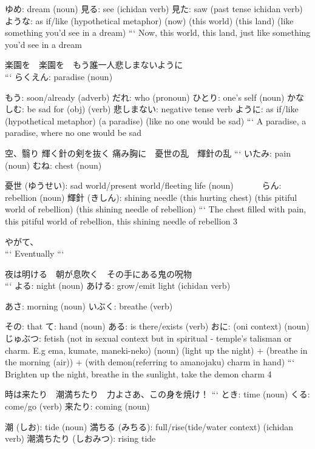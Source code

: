                             ゆめ: dream (noun)
                            見る: see (ichidan verb)
                            見た: saw (past tense ichidan verb)
                            ような: as if/like (hypothetical metaphor)
(now) (this world) (this land) (like something you'd see in a dream)
```
Now, this world, this land, just like something you'd see in a dream

楽園を　楽園を　もう誰一人悲しまないように \\
```
らくえん: paradise (noun)

              もう: soon/already (adverb)
                だれ: who (pronoun)
                ひとり: one's self (noun)
                          かなしむ: be sad for (obj) (verb)
                          悲しまない: negative tense verb
                                    ように: as if/like (hypothetical metaphor)
(a paradise) (like no one would be sad)
```
A paradise, a paradise, where no one would be sad

空、翳り
輝く針の剣を抜く
痛み胸に　憂世の乱　輝針の乱
```
いたみ: pain (noun)
    むね: chest (noun)

          憂世 (ゆうせい): sad world/present world/fleeting life (noun)
          　　　らん: rebellion (noun)
                  輝針 (きしん): shining needle
(this hurting chest) (this pitiful world of rebellion) (this shining needle of rebellion)
```
The chest filled with pain, this pitiful world of rebellion, this shining needle of rebellion {3}

やがて、 \\
```
Eventually
```

夜は明ける　朝が息吹く　その手にある鬼の呪物 \\
```
よる: night (noun)
あける: grow/emit light (ichidan verb)

あさ: morning (noun)
いぶく: breathe (verb)

その: that
て: hand (noun)
ある: is there/exists (verb)
おに: (oni context) (noun)
じゅぶつ: fetish (not in sexual context but in spiritual - temple's talisman or charm. E.g ema, kumate, maneki-neko) (noun)
(light up the night) + (breathe in the morning (air)) + (with demon(referring to amanojaku) charm in hand)
```
Brighten up the night, breathe in the sunlight, take the demon charm {4}

時は来たり　潮満ちたり　力よさあ、この身を焼け！
```
とき: time (noun)
くる: come/go (verb)
来たり: coming (noun)

            潮 (しお): tide (noun)
            満ちる (みちる): full/rise(tide/water context) (ichidan verb)
            潮満ちたり (しおみつ): rising tide

